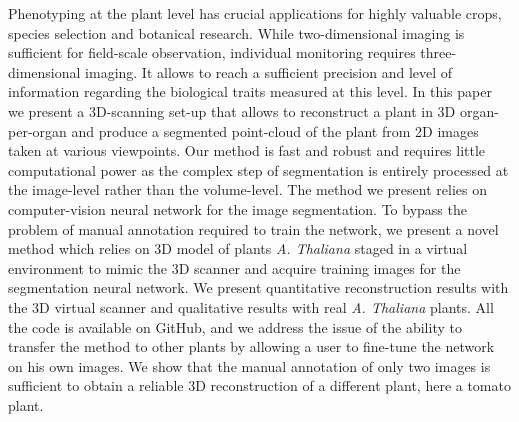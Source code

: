 Phenotyping at the plant level has crucial applications for highly valuable crops, species selection and botanical research. While two-dimensional imaging is sufficient for field-scale observation, individual monitoring requires three-dimensional imaging. It allows to reach a sufficient precision and level of information regarding the biological traits measured at this level. In this paper we present a 3D-scanning set-up that allows to reconstruct a plant in 3D organ-per-organ and produce a segmented point-cloud of the plant from 2D images taken at various viewpoints. Our method is fast and robust and requires little computational power as the complex step of segmentation is entirely processed at the image-level rather than the volume-level. The method we present relies on computer-vision neural network for the image segmentation. To bypass the problem of manual annotation required to train the network, we present a novel method which relies on 3D model of plants \emph{A. Thaliana} staged in a virtual environment to mimic the 3D scanner and acquire training images for the segmentation neural network. We present quantitative reconstruction results with the 3D virtual scanner and qualitative results with real \emph{A. Thaliana} plants. All the code is available on GitHub, and we address the issue of the ability to transfer the method to other plants by allowing a user to fine-tune the network on his own images. We show that the manual annotation of only two images is sufficient to obtain a reliable 3D reconstruction of a different plant, here a tomato plant.

